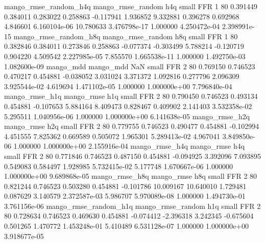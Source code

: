 mango_rmse_random_h4q mango_rmse_random                  h4q      small      FFR                 1 80 0.391449       0.384011 0.283022       0.258863   -0.117941      1.936852      9.332881     0.396278       0.692968  4.846601 6.160104e-06    10.780633   3.476798e-17            1.000000    4.250472e-04        2.398991e-15
mango_rmse_random_h8q mango_rmse_random                  h8q      small      FFR                 1 80 0.382846       0.384011 0.273846       0.258863   -0.077374     -0.303499      5.788214    -0.120719       0.904220  4.509542 2.227985e-05     7.855570   1.665538e-11            1.000000    1.492750e-03        1.082600e-09
            mango_mdd         mango_mdd                  NaN      small      FFR                 2 80 0.769150       0.746523 0.470217       0.454881   -0.038052      3.031024      3.371372     1.092816       0.277796  2.096309 3.925544e-02     4.619694   1.471102e-05            1.000000    1.000000e+00        7.796840e-04
       mango_rmse_h1q        mango_rmse                  h1q      small      FFR                 2 80 0.790450       0.746523 0.493134       0.454881   -0.107653      5.884164      8.409473     0.828467       0.409902  2.141403 3.532358e-02     5.295511   1.040956e-06            1.000000    1.000000e+00        6.141638e-05
       mango_rmse_h2q        mango_rmse                  h2q      small      FFR                 2 80 0.779755       0.746523 0.490477       0.454881   -0.102994      4.451555      7.825362     0.669589       0.505072  1.965301 5.289413e-02     4.967041   3.849850e-06            1.000000    1.000000e+00        2.155916e-04
       mango_rmse_h4q        mango_rmse                  h4q      small      FFR                 2 80 0.771846       0.746523 0.487150       0.454881   -0.094925      3.392096      7.093895     0.549083       0.584497  1.928985 5.732415e-02     5.177748   1.670667e-06            1.000000    1.000000e+00        9.689868e-05
       mango_rmse_h8q        mango_rmse                  h8q      small      FFR                 2 80 0.821244       0.746523 0.503280       0.454881   -0.101786     10.009167     10.640010     1.729481       0.087629  3.140579 2.372587e-03     5.986707   5.970089e-08            1.000000    1.494730e-01        3.761156e-06
mango_rmse_random_h1q mango_rmse_random                  h1q      small      FFR                 2 80 0.728634       0.746523 0.469630       0.454881   -0.074412     -2.396318      3.242345    -0.675604       0.501265  1.470772 1.453248e-01     5.410489   6.531128e-07            1.000000    1.000000e+00        3.918677e-05
